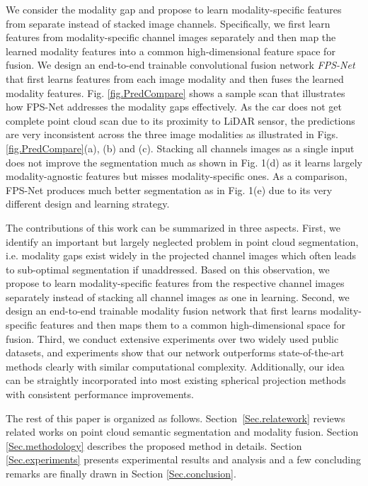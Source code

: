 \documentclass[preprint,review,3p]{elsarticle}
\begin{document}
We consider the modality gap and propose to learn modality-specific features from separate instead of stacked image channels. Specifically, we first learn features from modality-specific channel images separately and then map the learned modality features into a common high-dimensional feature space for fusion. We design an end-to-end trainable convolutional fusion network \textit{FPS-Net} that first learns features from each image modality and then fuses the learned modality features. Fig. \ref{fig.PredCompare} shows a sample scan that illustrates how FPS-Net addresses the modality gaps effectively. As the car does not get complete point cloud scan due to its proximity to LiDAR sensor, the predictions are very inconsistent across the three image modalities as illustrated in Figs. \ref{fig.PredCompare}(a), (b) and (c). Stacking all channels images as a single input does not improve the segmentation much as shown in Fig. 1(d) as it learns largely modality-agnostic features but misses modality-specific ones. As a comparison, FPS-Net produces much better segmentation as in Fig. 1(e) due to its very different design and learning strategy.

The contributions of this work can be summarized in three aspects. First, we identify an important but largely neglected problem in point cloud segmentation, i.e. modality gaps exist widely in the projected channel images which often leads to sub-optimal segmentation if unaddressed. Based on this observation, we propose to learn modality-specific features from the respective channel images separately instead of stacking all channel images as one in learning. Second, we design an end-to-end trainable modality fusion network that first learns modality-specific features and then maps them to a common high-dimensional space for fusion. Third, we conduct extensive experiments over two widely used public datasets, and experiments show that our network outperforms state-of-the-art methods clearly with similar computational complexity. Additionally, our idea can be straightly incorporated into most existing spherical projection methods with consistent performance improvements.

The rest of this paper is organized as follows. Section~\ref{Sec.relatework} reviews related works on point cloud semantic segmentation and modality fusion. Section \ref{Sec.methodology} describes the proposed method in details. Section \ref{Sec.experiments} presents experimental results and analysis and a few concluding remarks are finally drawn in Section \ref{Sec.conclusion}.
\end{document}

